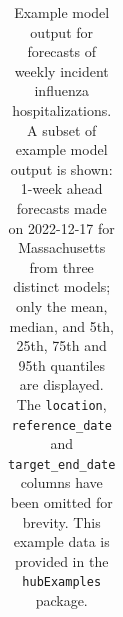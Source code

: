 \documentclass[
  letterpaper,
  DIV=11,
  numbers=noendperiod]{scrartcl}
\begin{document}
\begin{longtable}[]{@{}
  >{\raggedright\arraybackslash}p{}
  >{\raggedright\arraybackslash}p{}
  >{\raggedleft\arraybackslash}p{}
  >{\raggedright\arraybackslash}p{}
  >{\raggedright\arraybackslash}p{}
  >{\raggedleft\arraybackslash}p{}@{}}

\caption{\label{tbl-example-model-outputs}Example model output for
forecasts of weekly incident influenza hospitalizations. A subset of
example model output is shown: 1-week ahead forecasts made on 2022-12-17
for Massachusetts from three distinct models; only the mean, median, and
5th, 25th, 75th and 95th quantiles are displayed. The \texttt{location},
\texttt{reference\_date} and \texttt{target\_end\_date} columns have
been omitted for brevity. This example data is provided in the
\texttt{hubExamples} package.}

\tabularnewline


\end{longtable}
\end{document}
